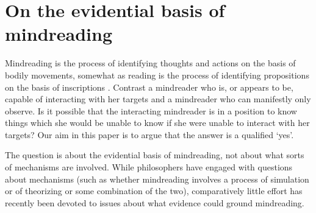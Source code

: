 \documentclass[12pt,\papersize]{extarticle}
\begin{document}
\section{On the evidential basis of mindreading}
\label{sec:intro}

Mindreading is
the process of identifying thoughts and actions on the basis of bodily movements,
somewhat as reading is the process of identifying propositions on the basis of inscriptions \citep[p.\ 4]{Apperly:2010kx}.
Contrast
a mindreader who is, or appears to be, capable of interacting with her targets 
and
a mindreader who can manifestly only observe.
Is it possible that the interacting mindreader is in a position to know things which she would be unable to know if she were unable to interact with her targets?
Our aim in this paper is to argue that the answer is a qualified `yes'.

The question is about the evidential basis of mindreading, 
not about what sorts of mechanisms are involved.
While philosophers have engaged with questions about mechanisms (such as whether mindreading involves a process of simulation or of theorizing or some combination of the two),
comparatively little effort has recently been devoted to issues about what evidence could ground mindreading.
\end{document}
